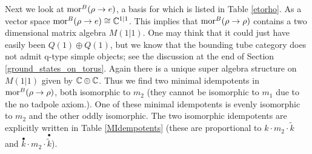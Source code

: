 Next we look at $\text{mor}^B(\rho \to e)$, 
a basis for which is listed in Table \ref{etorho}. 
As a vector space $\text{mor}^B(\rho \to e ) \cong \mathbb{C}^{1|1}$. 
This implies that $\text{mor}^B(\rho \to \rho)$ contains a two dimensional matrix algebra $M(1|1)$.
One may think that it could just have easily been $Q(1)\oplus Q(1)$, 
but we know that the bounding tube category does not admit q-type simple objects; see the discussion at the end of Section \ref{ground_states_on_torus}.
Again there is a unique super algebra structure on $M(1|1)$ given by $\mathbb{C} \oplus \mathbb{C}$. 
Thus we find two minimal idempotents in $\text{mor}^B(\rho \to \rho)$, both isomorphic to $m_2$ (they cannot be isomorphic to $m_1$ due to the no tadpole axiom.).
One of these minimal idempotents is evenly isomorphic to $m_2$ and the other oddly isomorphic. 
The two isomorphic idempotents are explicitly written in Table \ref{MIdempotents} (these are proportional to $k \cdot m_2\cdot  \tilde{k}$ and $\overset{\bullet}{k} \cdot m_2 \cdot \overset{\bullet}{\tilde{k}}$). 


